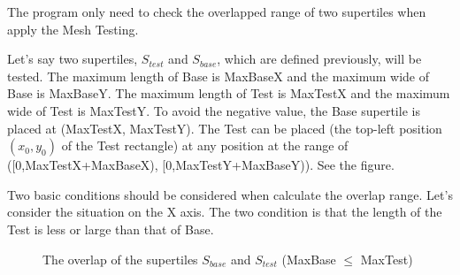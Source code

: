 \documentclass[preprint,natbib,10pt]{article}
\begin{document}
\begin{enumerate}
\begin{enumerate}
The program only need to check the overlapped range of two supertiles when apply the Mesh Testing.

Let's say two supertiles, $S_{test}$ and $S_{base}$, which are defined previously, will be tested. The maximum length of Base is MaxBaseX and the maximum wide of Base is MaxBaseY. The maximum length of Test is MaxTestX and the maximum wide of Test is MaxTestY. To avoid the negative value, the Base supertile is placed at (MaxTestX, MaxTestY). The Test can be placed (the top-left position $(x_0,y_0)$ of the Test rectangle) at any position at the range of ([0,MaxTestX+MaxBaseX), [0,MaxTestY+MaxBaseY)). See the figure.

Two basic conditions should be considered when calculate the overlap range. Let's consider the situation on the X axis. The two condition is that the length of the Test is less or large than that of Base.

\newcommand*{\drawlennotation}[5]{%
    \draw[#1] (#3, 0.1 + #4) -- (#3, -.1 + #4);
    \draw[#1] (#3 + #5, 0.1 + #4) -- (#3 + #5, -.1 + #4);
    \draw[<->,#1] (#3,#4) -- (#3 + #5, #4);
    \draw[#1] (#3 + 0.5 * #5, #4) -- (#3 + 0.5 * #5, #4 + 0.1) node [anchor=south] {#2};
}

\begin{figure} \centering

  \caption{The overlap of the supertiles $S_{base}$ and $S_{test}$ (MaxBase $\leq$ MaxTest)} \label{fig:overlapsupertilele}
\end{figure}

\begin{figure} \centering
\end{figure}
\end{enumerate}
\end{enumerate}
\end{document}
